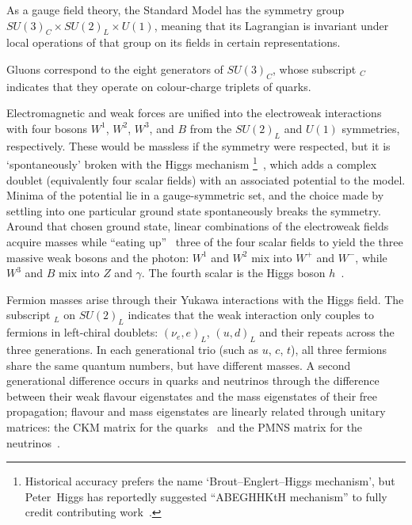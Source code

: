 As a gauge field theory, the Standard Model has the symmetry group
$SU\!(3)_C \times SU\!(2)_L \times U\!(1)$,
meaning that its Lagrangian is invariant under local operations of that group
on its fields in certain representations.

Gluons correspond to the eight generators of $SU\!(3)_C$, whose
subscript $_C$ indicates that they operate on colour-charge triplets of quarks.

Electromagnetic and weak forces are unified into the electroweak
interactions with four bosons $W^1$, $W^2$, $W^3$, and $B$ from the
$SU\!(2)_L$ and $U\!(1)$ symmetries, respectively.
These would be massless if the symmetry were respected, but it is
`spontaneously' broken with the Higgs mechanism
\footnote{%
Historical accuracy prefers the name `Brout–Englert–Higgs mechanism', but
Peter~Higgs has reportedly suggested ``ABEGHHKtH mechanism'' to fully credit
contributing work~\cite{close2011infinity}.%
}~\cite{
higgs1964broken,
englert1964broken
},
which adds a complex doublet (equivalently four scalar fields) with an
associated potential to the model.
Minima of the potential lie in a gauge-symmetric set, and the choice made by
settling into one particular ground state spontaneously breaks the symmetry.
Around that chosen ground state, linear combinations of the electroweak fields
acquire masses while ``eating up''~\cite{rubakov1999classical} three of the
four scalar fields to yield the three massive weak bosons and the photon:
$W^1$ and $W^2$ mix into $W^+$ and $W^-$, while $W^3$ and $B$ mix into $Z$ and
$\gamma$.
The fourth scalar is the Higgs boson $h$~\cite{
glashow1959renorm,
weinberg1967model,
salam1959weak,
rubakov1999classical,
cottingham2007greenwood
}.

Fermion masses arise through their Yukawa interactions with the Higgs field.
The subscript $_L$ on $SU\!(2)_L$ indicates that the weak interaction only
couples to fermions in left-chiral doublets: $(\nu_e, e)_L$,
$(u, d)_L$ and their repeats across the three generations.
In each generational trio (such as $u$, $c$, $t$), all three fermions share the
same quantum numbers, but have different masses.
A second generational difference occurs in quarks and neutrinos through the
difference between their weak flavour eigenstates and the mass eigenstates of
their free propagation;
flavour and mass eigenstates are linearly related through unitary matrices:
the CKM matrix for the quarks~\cite{
cabibbo1963unitary,
kabayasji1973cpv
}
and the PMNS matrix for the neutrinos~\cite{
maki1962remarks,
thomson2013modern
}.

